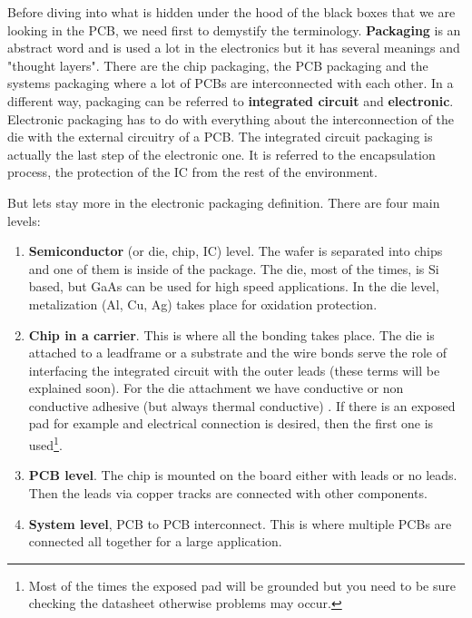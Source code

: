 \documentclass[final]{cubedoc}
\begin{document}
	Before diving into what is hidden under the hood of the black boxes that we are looking in the PCB, we need first to demystify the terminology. \textbf{Packaging} is an abstract word and is used a lot in the electronics but it has several meanings and "thought layers". There are the chip packaging, the PCB packaging and the systems packaging where a lot of PCBs are interconnected with each other. In a different way, packaging can be referred to \textbf{integrated circuit} and \textbf{electronic}. Electronic packaging has to do with everything about the interconnection of the die with the external circuitry of a PCB. The integrated circuit packaging is actually the last step of the electronic one. It is referred to the encapsulation process, the protection of the IC from the rest of the environment.
	
	But lets stay more in the electronic packaging definition. There are four main levels:
	
	\begin{enumerate}
		\item \textbf{Semiconductor} (or die, chip, IC) level. The wafer is separated into chips and one of them is inside of the package. The die, most of the times, is Si based, but GaAs can be used for high speed applications. In the die level, metalization (Al, Cu, Ag) takes place for oxidation protection.
		\item \textbf{Chip in a carrier}. This is where all the bonding takes place. The die is attached to a leadframe or a substrate  and the wire bonds serve the role of interfacing the integrated circuit with the outer leads (these terms will be explained soon). For the die attachment we have conductive or non conductive adhesive (but always thermal conductive) . If there is an exposed pad for example and electrical connection is desired, then the first one is used\footnote{Most of the times the exposed pad will be grounded but you need to be sure checking the datasheet otherwise problems may occur.}. 
		\item \textbf{PCB level}. The chip is mounted on the board either with leads or no leads. Then the leads via copper tracks are connected with other components.
		\item \textbf{System level}, PCB to PCB interconnect. This is where multiple PCBs are connected all together for a large application.
	\end{enumerate}
	
\end{document}
